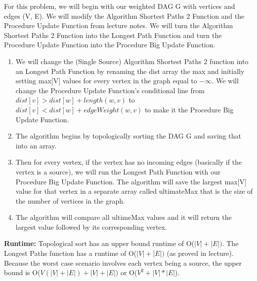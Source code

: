 \documentclass[11pt, solution, letterpaper]{format}
\begin{document}
For this problem, we will begin with our weighted DAG G with vertices and edges (V, E). We will modify the Algorithm Shortest Paths 2 Function and the Procedure Update Function from lecture notes. We will turn the Algorithm Shortest Paths 2 Function into the Longest Path Function and turn the Procedure Update Function into the Procedure Big Update Function.\\ \begin{enumerate}


\item We will change the (Single Source) Algorithm Shortest Paths 2 function into  an Longest Path Function by renaming the dist array the max and initially setting max[V] values for every vertex in the graph equal to $-\infty$. We will change the Procedure Update Function's conditional line from $dist[v] > dist[w]+ length(w,v)$ to $dist[v] < dist[w]+ edgeWeight(w,v)$ to make it the Procedure Big Update Function.  
\item The algorithm begins by topologically sorting the DAG G and saving that into an array. 
\item Then for every vertex, if the vertex has no incoming edges (basically if the vertex is a source), we will run the Longest Path Function with our Procedure Big Update Function. The algorithm will save the largest max[V] value for that vertex in a separate array called ultimateMax that is the size of the number of vertices in the graph. 
\item The algorithm will compare all ultimeMax values and it will return the largest value followed by its corresponding vertex.

\end{enumerate}

\textbf{Runtime:} Topological sort has an upper bound runtime of O($|V| + |E|)$. The Longest Paths function has a runtime of O($|V| + |E|)$ (as proved in lecture). Because the worst case scenario involves each vertex being a source, the upper bound is O($V(|V| + |E|) + |V| + |E|)$ or  O($V^2 + |V|*|E|$).  \\
\end{document}
